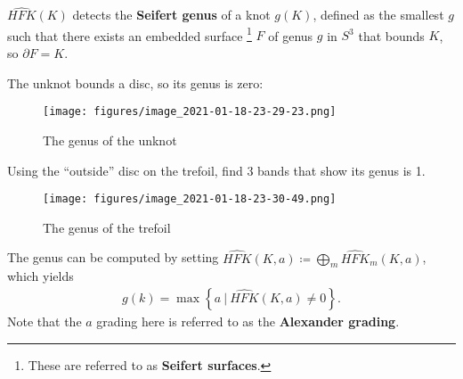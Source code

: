 \begin{fact}

\(\widehat{HFK}(K)\) detects the \textbf{Seifert genus} of a knot
\(g(K)\), defined as the smallest \(g\) such that there exists an
embedded surface \footnote{These are referred to as \textbf{Seifert
  surfaces}.} \(F\) of genus \(g\) in \(S^3\) that bounds \(K\), so
\({{\partial}}F = K\).

\begin{example}

The unknot bounds a disc, so its genus is zero:

\begin{figure}
\centering
\texttt{[image: figures/image\_2021-01-18-23-29-23.png]}
\caption{The genus of the unknot}
\end{figure}

\end{example}

\begin{exercise}

Using the ``outside'' disc on the trefoil, find 3 bands that show its
genus is 1.

\begin{figure}
\centering
\texttt{[image: figures/image\_2021-01-18-23-30-49.png]}
\caption{The genus of the trefoil}
\end{figure}

\end{exercise}

The genus can be computed by setting
\(\widehat{HFK}(K, a) \coloneqq\bigoplus _m \widehat{HFK}_m(K, a)\),
which yields
\begin{align*}
g(k) = \max \left\{{ a {~\mathrel{\Big|}~}\widehat{HFK}(K, a) \neq 0 }\right\}
.\end{align*}
Note that the \(a\) grading here is referred to as the \textbf{Alexander
grading}.

\end{fact}

